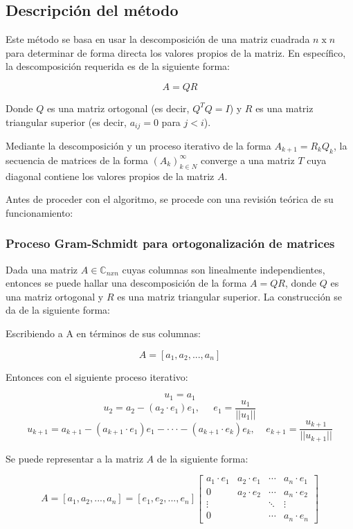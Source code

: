 
\subsection{Descripción del método}
Este método se basa en usar la descomposición de una matriz cuadrada $ n \;\text{x}\; n$ para determinar de forma directa los valores propios de la matriz. En específico, la descomposición requerida es de la siguiente forma: 

$$  A = QR$$

Donde  $Q$ es una matriz ortogonal (es decir, $Q^TQ = I$) y $R$ es una matriz triangular superior (es decir, $a_{ij} = 0$ para $ j < i$).  

Mediante la descomposición y un proceso iterativo de la forma $A_{k+1} = R_kQ_k $, la secuencia de matrices de la forma $ {(A_k)}_{k \in N}^\infty $ converge a una matriz $T$ cuya diagonal contiene los valores propios de la matriz $A$.

Antes de proceder con el algoritmo, se procede con una revisión teórica de su funcionamiento:

\subsubsection{Proceso Gram-Schmidt para ortogonalización de matrices}

Dada una matriz $ A \in  \mathbb {C}_ {nxn} $ cuyas columnas son linealmente independientes, entonces se puede hallar una descomposición de la forma $ A = QR$, donde  $Q$ es una matriz ortogonal y $R$ es una matriz triangular superior. La construcción se da de la siguiente forma:


Escribiendo a A en términos de sus columnas: 

$$
A = [a_1, a_2, ... , a_n]
$$

Entonces con el siguiente proceso iterativo:

$$
u_1 = a_1 $$$$
u_2 = a_2 - (a_2\cdot e_1)e_1, \;\;\;\;\; e_1 = \frac{u_1}{||u_1||}
$$$$
u_ {k+1} = a_ {k+1} - (a_ {k+1}\cdot e_1)e_1 - \cdot\cdot\cdot - (a_ {k+1}\cdot e_k)e_k, \;\;\;\; e_ {k+1} = \frac{u_{k+1}}{||u_{k+1}||} 
$$

Se puede representar a la matriz $A $ de la siguiente forma:

$$
A = [a_1, a_2, ... , a_n] = [e_1, e_2, ... , e_n]\begin{bmatrix}
    a_1\cdot e_1 & a_2\cdot e_1 & \cdots  & a_n\cdot e_1 \\
    0 & a_2\cdot e_2 & \cdots  & a_n\cdot e_2 \\
    \vdots & &\ddots & \vdots \\
    0 & &\cdots  & a_n\cdot e_n
\end{bmatrix}
$$

